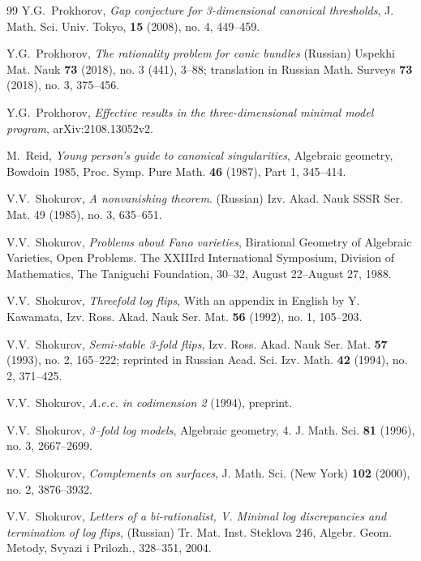 \documentclass[11pt]{amsart}
\numberwithin{equation}{section}
\theoremstyle{definition}
\theoremstyle{definition}
\begin{document}
\begin{thebibliography}{99}
 Y.G.~Prokhorov, \textit{Gap conjecture for 3-dimensional canonical thresholds}, J. Math. Sci. Univ. Tokyo, \textbf{15} (2008), no. 4, 449--459.


 Y.G.~Prokhorov, \textit{The rationality problem for conic bundles} (Russian) Uspekhi Mat. Nauk \textbf{73} (2018), no. 3 (441), 3--88; translation in Russian Math. Surveys \textbf{73} (2018), no. 3, 375--456. 

Y.G.~Prokhorov, \textit{Effective results in the three-dimensional minimal model program}, arXiv:2108.13052v2.



 M.~Reid, \textit{Young person’s guide to canonical singularities}, Algebraic geometry, Bowdoin 1985, Proc. Symp. Pure Math. \textbf{46} (1987), Part 1, 345--414.



 V.V.~Shokurov, {\it A nonvanishing theorem}. (Russian) Izv. Akad. Nauk SSSR Ser. Mat. 49 (1985), no. 3, 635--651.

 V.V.~Shokurov, {\it Problems about {F}ano varieties}, {Birational Geometry of Algebraic Varieties, Open Problems. The XXIIIrd International Symposium, Division of Mathematics, The Taniguchi Foundation}, 30--32, August 22--August 27, 1988.

 V.V.~Shokurov, \textit{Threefold log flips}, With an appendix in English by Y. Kawamata, Izv.
Ross. Akad. Nauk Ser. Mat. \textbf{56} (1992), no. 1, 105--203.

 V.V.~Shokurov, \textit{Semi-stable 3-fold flips}, Izv. Ross. Akad. Nauk Ser. Mat. \textbf{57} (1993), no. 2, 165--222; reprinted in
Russian Acad. Sci. Izv. Math. \textbf{42} (1994), no. 2, 371--425.

 V.V.~Shokurov, \textit{A.c.c. in codimension 2} (1994), preprint.

 V.V.~Shokurov, \textit{3--fold log models}, Algebraic geometry, 4.
J. Math. Sci. \textbf{81} (1996), no. 3, 2667--2699.

 V.V.~Shokurov, \textit{Complements on surfaces}, J. Math. Sci. (New York) \textbf{102} (2000), no. 2, 3876--3932.

 V.V.~Shokurov, \textit{Letters of a bi-rationalist, V. Minimal log discrepancies and termination of log flips}, (Russian) Tr. Mat. Inst. Steklova 246, Algebr. Geom. Metody, Svyazi i Prilozh., 328--351, 2004.	


\end{thebibliography}
\end{document}
